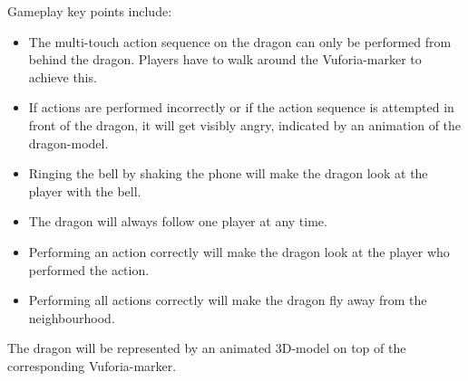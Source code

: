 \documentclass{sigchi-ext}
\begin{document}
Gameplay key points include:

\begin{itemize}\compresslist%
\item The multi-touch action sequence on the dragon can only be performed from behind the dragon. Players have to walk around the Vuforia-marker to achieve this.
\item If actions are performed incorrectly or if the action sequence is attempted in front of the dragon, it will get visibly angry, indicated by an animation of the dragon-model.
\item Ringing the bell by shaking the phone will make the dragon look at the player with the bell.
\item The dragon will always follow one player at any time.
\item Performing an action correctly will make the dragon look at the player who performed the action.
\item Performing all actions correctly will make the dragon fly away from the neighbourhood.
\end{itemize}

The dragon will be represented by an animated 3D-model \cite{dragonModel} on top of the corresponding Vuforia-marker.


\balance{} 



\end{document}
